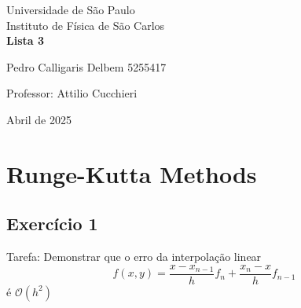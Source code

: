 \documentclass[12pt, a4paper]{article} %
\begin{document}
	
	\begin{titlepage}
		\begin{center}
\Huge{Universidade de São Paulo}\\
\large{Instituto de Física de São Carlos}\\
\vspace{20pt}
\vspace{200pt}
\textbf{Lista 3}\\
\vspace{8cm}
		\end{center}

\begin{flushleft}
\begin{tabbing}
Pedro Calligaris Delbem 5255417\\
\end{tabbing}
\vspace{0.5cm}
Professor: Attilio Cucchieri\\		
		\end{flushleft}
	
		\begin{center}
			\vspace{\fill}
	Abril de 2025	
		\end{center}
	\end{titlepage}

	\tableofcontents 
	\thispagestyle{empty}
	\newpage

\section{Runge-Kutta Methods}

    \subsection{Exerc\'icio 1}

        Tarefa: Demonstrar que o erro da interpola\c{c}\~ao linear
        \begin{equation*}
            f(x,y) = \frac{x - x_{n-1}}{h}f_{n} + \frac{x_{n} - x}{h}f_{n-1}
        \end{equation*}
        \'e $\mathcal{O}(h^{2})$
\end{document}
